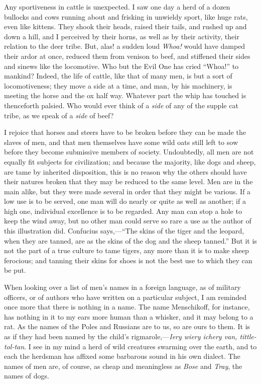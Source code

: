 \documentclass[twoside,openright,10pt]{memoir} %
\begin{document}
Any sportiveness in cattle is unexpected. I saw one day a herd of a dozen bullocks and cows running about and frisking in unwieldy sport, like huge rats, even like kittens. They shook their heads, raised their tails, and rushed up and down a hill, and I perceived by their horns, as well as by their activity, their relation to the deer tribe. But, alas! a sudden loud \emph{Whoa!} would have damped their ardor at once, reduced them from venison to beef, and stiffened their sides and sinews like the locomotive. Who but the Evil One has cried “Whoa!” to mankind? Indeed, the life of cattle, like that of many men, is but a sort of locomotiveness; they move a side at a time, and man, by his machinery, is meeting the horse and the ox half way. Whatever part the whip has touched is thenceforth palsied. Who would ever think of a \emph{side} of any of the supple cat tribe, as we speak of a \emph{side} of beef?

I rejoice that horses and steers have to be broken before they can be made the slaves of men, and that men themselves have some wild oats still left to sow before they become submissive members of society. Undoubtedly, all men are not equally fit subjects for civilization; and because the majority, like dogs and sheep, are tame by inherited disposition, this is no reason why the others should have their natures broken that they may be reduced to the same level. Men are in the main alike, but they were made several in order that they might be various. If a low use is to be served, one man will do nearly or quite as well as another; if a high one, individual excellence is to be regarded. Any man can stop a hole to keep the wind away, but no other man could serve so rare a use as the author of this illustration did. Confucius says,—“The skins of the tiger and the leopard, when they are tanned, are as the skins of the dog and the sheep tanned.” But it is not the part of a true culture to tame tigers, any more than it is to make sheep ferocious; and tanning their skins for shoes is not the best use to which they can be put.

When looking over a list of men’s names in a foreign language, as of military officers, or of authors who have written on a particular subject, I am reminded once more that there is nothing in a name. The name Menschikoff, for instance, has nothing in it to my ears more human than a whisker, and it may belong to a rat. As the names of the Poles and Russians are to us, so are ours to them. It is as if they had been named by the child’s rigmarole,—\emph{Iery wiery ichery van, tittle-tol-tan}. I see in my mind a herd of wild creatures swarming over the earth, and to each the herdsman has affixed some barbarous sound in his own dialect. The names of men are, of course, as cheap and meaningless as \emph{Bose} and \emph{Tray}, the names of dogs.
\end{document}
